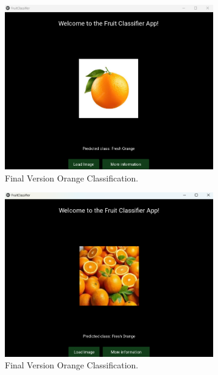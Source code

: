 \documentclass[conference]{IEEEtran}
\begin{document}
\begin{figure}[h]
\begin{subfigure}[b]{0.48\linewidth}
        \includegraphics[width=\linewidth]{Mlayer orage1.png}
        \caption{Final Version Orange Classification.}
        \label{figFA}
    \end{subfigure}
    \hfill
    \begin{subfigure}[b]{0.48\linewidth}
        \centering
        \includegraphics[width=\linewidth]{Mlayer orage2.png}
        \caption{Final Version Orange Classification.}
        \label{figFB}
    \end{subfigure}
    \hfill
    \begin{subfigure}[b]{0.48\linewidth}
        \centering

\end{subfigure}
\end{figure}
\end{document}
